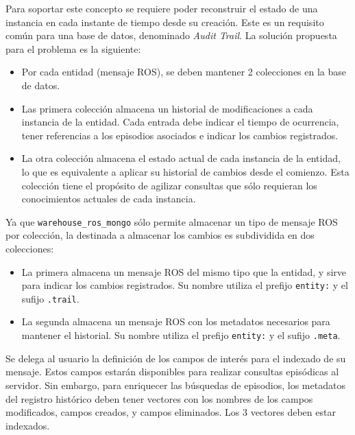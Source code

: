 Para soportar este concepto se requiere poder reconstruir el estado de una instancia en cada instante de tiempo desde su creación. Este es un requisito común para una base de datos, denominado \textit{Audit Trail}. La solución propuesta para el problema es la siguiente:
\begin{itemize}
\item Por cada entidad (mensaje ROS), se deben mantener 2 colecciones en la base de datos.
\item Las primera colección almacena un historial de modificaciones a cada instancia de la entidad. Cada entrada debe indicar el tiempo de ocurrencia, tener referencias a los episodios asociados e indicar los cambios registrados.
\item La otra colección almacena el estado actual de cada instancia de la entidad, lo que es equivalente a aplicar su historial de cambios desde el comienzo. Esta colección tiene el propósito de agilizar consultas que sólo requieran los conocimientos actuales de cada instancia.
\end{itemize}
Ya que \texttt{warehouse\_ros\_mongo} sólo permite almacenar un tipo de mensaje ROS por colección, la destinada a almacenar los cambios es subdividida en dos colecciones:
\begin{itemize}
\item La primera almacena un mensaje ROS del mismo tipo que la entidad, y sirve para indicar los cambios registrados. Su nombre utiliza el prefijo \texttt{entity:} y el sufijo \texttt{.trail}.
\item La segunda almacena un mensaje ROS con los metadatos necesarios para mantener el historial. Su nombre utiliza el prefijo \texttt{entity:} y el sufijo \texttt{.meta}.
\end{itemize}

Se delega al usuario la definición de los campos de interés para el indexado de su mensaje. Estos campos estarán disponibles para realizar consultas episódicas al servidor. Sin embargo, para enriquecer las búsquedas de episodios, los metadatos del registro histórico deben tener vectores con los nombres de los campos modificados, campos creados, y campos eliminados. Los 3 vectores deben estar indexados.


